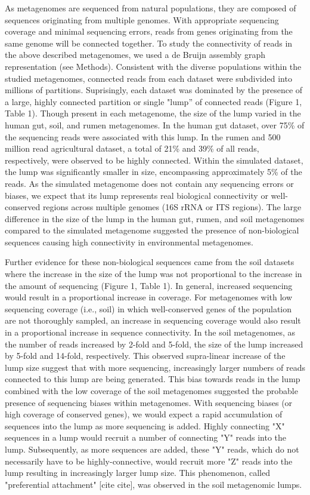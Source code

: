 \documentclass[11pt]{article} %
\begin{document}
As metagenomes are sequenced from natural populations, they are composed of sequences originating from multiple genomes.  With appropriate sequencing coverage and minimal sequencing errors, reads from genes originating from the same genome will be connected together.  To study the connectivity of reads in the above described metagenomes, we used a de Bruijn assembly graph representation (see Methods).  Consistent with the diverse populations within the studied metagenomes, connected reads from each dataset were subdivided into millions of partitions.  Suprisingly, each dataset was dominated by the presence of a large, highly connected partition or single "lump'' of connected reads (Figure 1, Table 1).   Though present in each metagenome, the size of the lump varied in the human gut, soil, and rumen metagenomes.  In the human gut dataset, over 75\% of the sequencing reads were associated with this lump.  In the rumen and 500 million read agricultural dataset, a total of 21\% and 39\% of all reads, respectively, were observed to be highly connected. Within the simulated dataset, the lump was significantly smaller in size, encompassing approximately 5\% of the reads.  As the simulated metagenome does not contain any sequencing errors or biases, we expect that its lump represents real biological connectivity or well-conserved regions across multiple genomes (16S rRNA or ITS regions).  The large difference in the size of the lump in the human gut, rumen, and soil metagenomes compared to the simulated metagenome suggested the presence of non-biological sequences causing high connectivity in environmental metagenomes.

Further evidence for these non-biological sequences came from the soil datasets where the increase in the size of the lump was not proportional to the increase in the amount of sequencing (Figure 1, Table 1).  In general, increased sequencing would result in a proportional increase in coverage.  For metagenomes with low sequencing coverage (i.e., soil) in which well-conserved genes of the population are not thoroughly sampled, an increase in sequencing coverage would also result in a proportional increase in sequence connectivity.  In the soil metagenomes, as the number of reads increased by 2-fold and 5-fold, the size of the lump increased by 5-fold and 14-fold, respectively. This observed supra-linear increase of the lump size suggest that with more sequencing, increasingly larger numbers of reads connected to this lump are being generated.  This bias towards reads in the lump combined with the low coverage of the soil metagenomes suggested the probable presence of sequencing biases within metagenomes.  With sequencing biases (or high coverage of conserved genes), we would expect a rapid accumulation of sequences into the lump as more sequencing is added. Highly connecting "X" sequences in a lump would recruit a number of connecting "Y" reads into the lump.  Subsequently, as more sequences are added, these "Y" reads, which do not necessarily have to be highly-connective, would recruit more "Z" reads into the lump resulting in increasingly larger lump size.  This phenomenon, called "preferential attachment" [cite cite], was observed in the soil metagenomic lumps.
\end{document}
